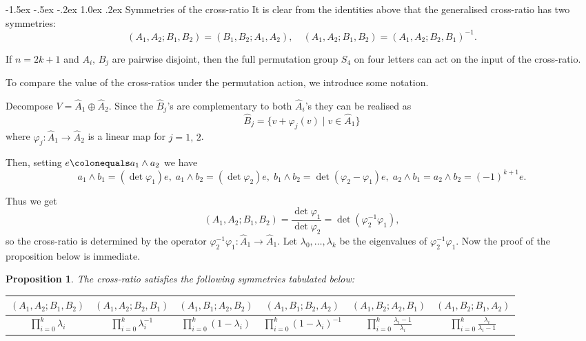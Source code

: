 \documentclass[11pt,a4paper]{amsart}
\makeatletter
\renewcommand\subsection{\@startsection{subsection}{2}{\z@}
                                   {-1.5ex \@plus -.5ex \@minus -.2ex}%
                                   {1.0ex \@plus.2ex}%
                                   {\normalfont\itshape}}%
\theoremstyle{plain}
\newtheorem{proposition}[theorem]{Proposition}
\theoremstyle{definition}
\theoremstyle{remark}
\newcommand{\coleq}{\colonequals}
\makeatother
\begin{document}
    \subsection{Symmetries of the cross-ratio}
    It is clear from the identities above that the generalised cross-ratio has two symmetries:
\begin{equation*}
(A_1,A_2;B_1,B_2) = (B_1,B_2;A_1,A_2), \quad (A_1,A_2;B_1,B_2) = (A_1,A_2;B_2,B_1)^{-1}.
\end{equation*}

\medskip

 If $n=2k+1$ and $A_i,\,B_j$ are pairwise disjoint, then the full permutation group $S_4$ on four letters can act on the input of the cross-ratio. 

To compare the value of the cross-ratios under the permutation action, we introduce some notation.

Decompose $V = \hat{A}_1\oplus \hat{A}_2$. Since the $\hat{B}_j$'s are complementary to both $\hat{A}_i$'s they can be realised as 
\[
\hat{B}_j  = \{v + \varphi_j (v)\mid v\in \hat{A}_1\}
\]
where $\varphi_j \colon \hat{A}_1 \to \hat{A}_2$ is a linear map for $j=1,\,2$.

Then, setting $e \coleq a_1 \wedge a_2$ we have 
\[
    a_1\wedge b_1 = (\det\varphi_1) e, \; 
    a_1\wedge b_2 = (\det\varphi_2)e, \;
    b_1\wedge b_2 = \det(\varphi_2 -\varphi_1)e, \;
    a_2 \wedge b_1 = a_2\wedge b_2 = (-1)^{k+1}e.
\]

Thus we get
\[
(A_1,A_2;B_1,B_2) = \frac{\det\varphi_1}{\det\varphi_2} = \det(\varphi_2^{-1}\varphi_1),
\]
so the cross-ratio is determined by the operator $\varphi_2^{-1}\varphi_1 \colon \hat{A}_1\to \hat{A}_1$. Let $\lambda_0, \dots, \lambda_k$ be the eigenvalues of $\varphi_2^{-1}\varphi_1$. Now the proof of the proposition below is immediate.

\begin{proposition}\label{prop:symmetries}
  The cross-ratio satisfies the following symmetries tabulated below:
  \medskip
    \begin{center}
    \small
    \setlength{\tabcolsep}{3pt}
    \begin{tabular}{@{}cccccc@{}}
      $(A_1,A_2;B_1,B_2)$ & $(A_1,A_2;B_2,B_1)$ & $(A_1,B_1;A_2,B_2)$ & $(A_1,B_1;B_2,A_2)$ & $(A_1,B_2;A_2,B_1)$ & $(A_1,B_2;B_1,A_2)$ \\
      \midrule
      $\displaystyle\prod_{i=0}^k \lambda_i$ & $\displaystyle\prod_{i=0}^k \lambda_i^{-1}$ & $\displaystyle\prod_{i=0}^k (1-\lambda_i)$ & $\displaystyle\prod_{i=0}^k (1-\lambda_i)^{-1}$ & $\displaystyle\prod_{i=0}^k \frac{\lambda_i-1}{\lambda_i}$ & $\displaystyle\prod_{i=0}^k \frac{\lambda_i}{\lambda_i-1}$ \\
    \end{tabular}
    \end{center}
\end{proposition}
\end{document}
